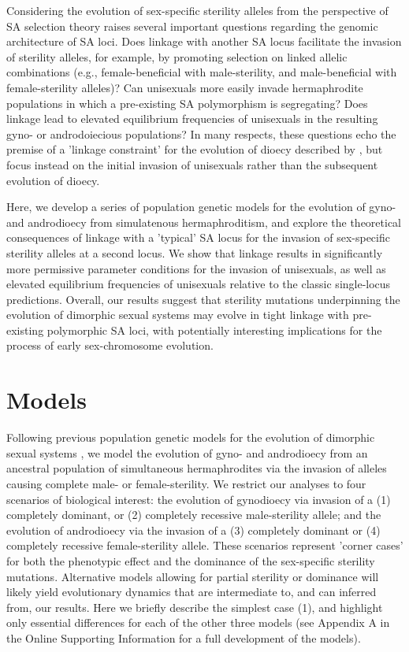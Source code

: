 \documentclass[9pt,twocolumn,twoside,lineno]{gsajnl}
\begin{document}
Considering the evolution of sex-specific sterility alleles from the perspective of SA selection theory raises several important questions regarding the genomic architecture of SA loci. Does linkage with another SA locus facilitate the invasion of sterility alleles, for example, by promoting selection on linked allelic combinations (e.g., female-beneficial with male-sterility, and male-beneficial with female-sterility alleles)? Can unisexuals more easily invade hermaphrodite populations in which a pre-existing SA polymorphism is segregating? Does linkage lead to elevated equilibrium frequencies of unisexuals in the resulting gyno- or androdoiecious populations? In many respects, these questions echo the premise of a 'linkage constraint' for the evolution of dioecy described by \citet{Charlesworth1978a}, but focus instead on the initial invasion of unisexuals rather than the subsequent evolution of dioecy. 

Here, we develop a series of population genetic models for the evolution of gyno- and androdioecy from simulatenous hermaphroditism, and explore the theoretical consequences of linkage with a 'typical' SA locus for the invasion of sex-specific sterility alleles at a second locus. We show that linkage results in significantly more permissive parameter conditions for the invasion of unisexuals, as well as elevated equilibrium frequencies of unisexuals relative to the classic single-locus predictions. Overall, our results suggest that sterility mutations underpinning the evolution of dimorphic sexual systems may evolve in tight linkage with pre-existing polymorphic SA loci, with potentially interesting implications for the process of early sex-chromosome evolution.


\section{Models} \label{sec:methods}

Following previous population genetic models for the evolution of dimorphic sexual systems \citep{Charlesworth1978a}, we model the evolution of gyno- and androdioecy from an ancestral population of simultaneous hermaphrodites via the invasion of alleles causing complete male- or female-sterility. We restrict our analyses to four scenarios of biological interest: the evolution of gynodioecy via invasion of a (1) completely dominant, or (2) completely recessive male-sterility allele; and the evolution of androdioecy via the invasion of a (3) completely dominant or (4) completely recessive female-sterility allele. These scenarios represent 'corner cases' for both the phenotypic effect and the dominance of the sex-specific sterility mutations. Alternative models allowing for partial sterility or dominance will likely yield evolutionary dynamics that are intermediate to, and can inferred from, our results. Here we briefly describe the simplest case (1), and highlight only essential differences for each of the other three models (see Appendix A in the Online Supporting Information for a full development of the models). 
\end{document}
